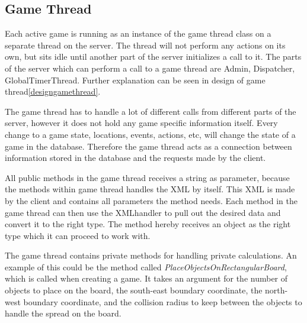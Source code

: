 \subsection{Game Thread}
\label{sec:gamethreadimpl}
Each active game is running as an instance of the game thread class on a separate thread on the server. The thread will not perform any actions on its own, but sits idle until another part of the server initializes a call to it. The parts of the server which can perform a call to a game thread are Admin, Dispatcher, GlobalTimerThread. Further explanation can be seen in design of game thread\ref{designgamethread}. 

The game thread has to handle a lot of different calls from different parts of the server, however it does not hold any game specific information itself. Every change to a game state, locations, events, actions, etc, will change the state of a game in the database. Therefore the game thread acts as a connection between information stored in the database and the requests made by the client.

All public methods in the game thread receives a string as parameter, because the methods within game thread handles the XML by itself. This XML is made by the client and contains all parameters the method needs. Each method in the game thread can then use the XMLhandler to pull out the desired data and convert it to the right type. The method hereby receives an object as the right type which it can proceed to work with.

The game thread contains private methods for handling private calculations. An example of this could be the method called \textit{PlaceObjectsOnRectangularBoard}, which is called when creating a game. It takes an argument for the number of objects to place on the board, the south-east boundary coordinate, the north-west boundary coordinate, and the collision radius to keep between the objects to handle the spread on the board. 


